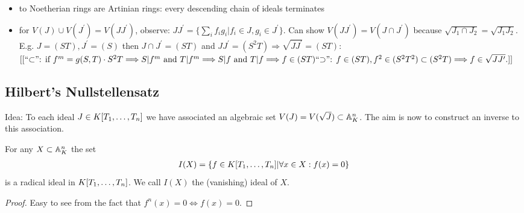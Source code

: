 \documentclass[a4paper,11pt]{article}
\begin{document}
			\begin{remark}
				\begin{itemize}
					\item {} to Noetherian rings are Artinian rings: every descending chain of ideals terminates
					\item for $V(J)\cup V(J^\prime)=V(JJ^{\prime})$, observe: $JJ^{\prime}=\{\sum_if_ig_i|f_i\in J,g_i\in J^{\prime}\}$. Can show $V(JJ^{\prime})=V(J\cap J^{\prime})$ because $\sqrt{J_1\cap J_2}=\sqrt{J_1J_2}$.
					\\E.g. $J=(ST), J^{\prime}=(S)$ then $J\cap J^{\prime}=(ST)$ and $JJ^{\prime}=(S^2T)\Longrightarrow\sqrt{JJ^{\prime}}=(ST)$: \\$[[\text{``$\subset$'': if $f^m=g(S,T)\cdot S^2T\Longrightarrow S|f^m$ and $T|f^m\Longrightarrow S|f$ and $T|f\Longrightarrow f\in(ST)$}\\\text{``$\supset$'': $f\in(ST), f^2\in(S^2T^2)\subset(S^2T)\Longrightarrow f\in\sqrt{JJ^{\prime}}$}.]]$ 
				\end{itemize}
			\end{remark}


		\subsection{Hilbert's Nullstellensatz}
		
			Idea: To each ideal $J\in\K$ we have associated an algebraic set $V(J)=V(\sqrt{J})\subset\AA^n_K$. The aim is now to construct an inverse to this association.

			\begin{prop}
				For any $X\subset\AA^n_K$ the set
				\begin{align*}
					I(X)=\{f\in\K|\forall x\in X:f(x)=0\}
				\end{align*}
				is a radical ideal in $\K$. We call $I(X)$ the (vanishing) ideal of $X$.
			\end{prop}
			\begin{proof}
				Easy to see from the fact that $f^n(x)=0\Longleftrightarrow f(x)=0$.
			\end{proof}
\end{document}
